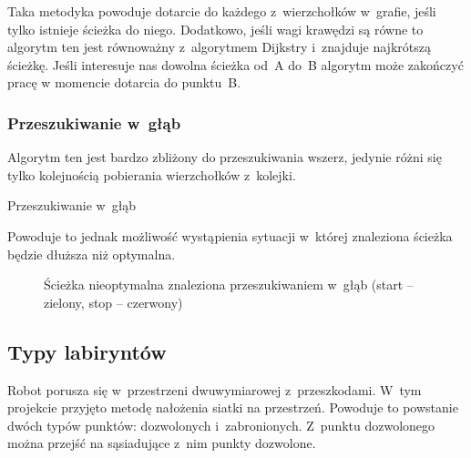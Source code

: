 \documentclass[11pt,a4paper,oneside]{mwart}
\begin{document}
Taka metodyka powoduje dotarcie do każdego z~wierzchołków w~grafie, jeśli tylko istnieje ścieżka do niego.
Dodatkowo, jeśli wagi krawędzi są równe to algorytm ten jest równoważny z~algorytmem Dijkstry i~znajduje 
najkrótszą ścieżkę.
Jeśli interesuje nas dowolna ścieżka od~A do~B algorytm może zakończyć pracę w momencie dotarcia do punktu~B.


\subsubsection{Przeszukiwanie w~głąb}
Algorytm ten jest bardzo zbliżony do przeszukiwania wszerz, jedynie różni się tylko kolejnością pobierania 
wierzchołków z~kolejki.
\begin{algorithm}
\caption{Przeszukiwanie w~głąb}
\label{algorytm_w_glab}
\begin{algorithmic}[1]
		\ENDIF
	\ENDFOR
\ENDWHILE
\end{algorithmic}
\end{algorithm}

Powoduje to jednak możliwość wystąpienia sytuacji w~której znaleziona ścieżka będzie dłuższa niż optymalna.

\begin{figure}[!h]
\centering
{}
\caption{Ścieżka nieoptymalna znaleziona przeszukiwaniem w~głąb (start -- zielony, stop -- czerwony)\label{petla}}
\end{figure}

\subsection{Typy labiryntów}
Robot porusza się w~przestrzeni dwuwymiarowej z~przeszkodami. 
W~tym projekcie przyjęto metodę nałożenia siatki na przestrzeń. 
Powoduje to powstanie dwóch typów punktów: dozwolonych i~zabronionych. 
Z~punktu dozwolonego można przejść na sąsiadujące z~nim punkty dozwolone.
\end{document}
